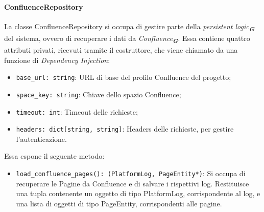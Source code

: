 \paragraph{ConfluenceRepository}
\label{sec:confluence_repository}
La classe ConfluenceRepository si occupa di gestire parte della \emph{persistent logic}\textsubscript{\textbf{\textit{G}}} del sistema, ovvero di recuperare i dati da \emph{Confluence}\textsubscript{\textbf{\textit{G}}}. Essa contiene quattro attributi privati, ricevuti tramite il costruttore, che viene chiamato da una funzione di \emph{Dependency Injection}:
\begin{itemize}
    \item \texttt{base\_url: string}: URL di base del profilo Confluence del progetto;
    \item \texttt{space\_key: string}: Chiave dello spazio Confluence;
    \item \texttt{timeout: int}: Timeout delle richieste;
    \item \texttt{headers: dict[string, string]}: Headers delle richieste, per gestire l'autenticazione.
\end{itemize}
Essa espone il seguente metodo:
\begin{itemize}
    \item \texttt{load\_confluence\_pages(): (PlatformLog, PageEntity*)}: Si occupa di recuperare le Pagine da Confluence e di salvare i rispettivi log. Restituisce una tupla contenente un oggetto di tipo PlatformLog, corrispondente al log, e una lista di oggetti di tipo PageEntity, corrispondenti alle pagine.
\end{itemize}

